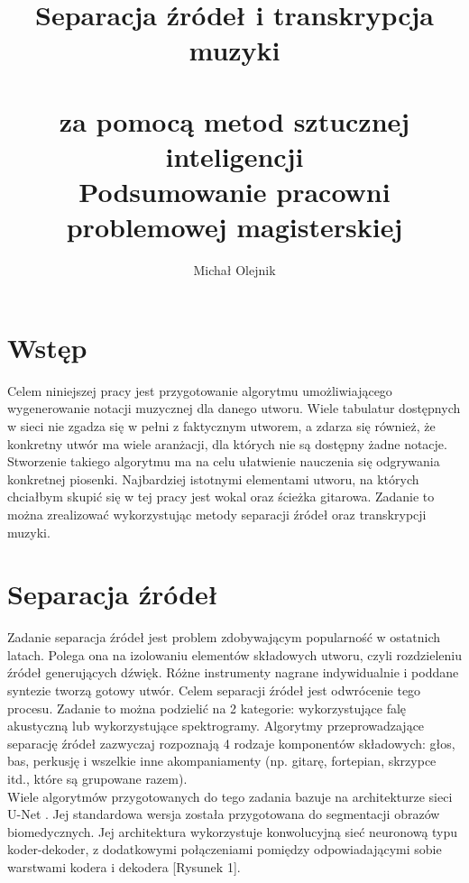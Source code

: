 \documentclass{article}
\begin{document}
\title{%
  Separacja źródeł i transkrypcja muzyki \\ \\
  za pomocą metod sztucznej inteligencji \\
  \vspace{1em} \large Podsumowanie pracowni problemowej magisterskiej}

\author{Michał Olejnik}
\date{}
\maketitle
{
    \hypersetup{linkcolor=black}
    \tableofcontents
}

\section{Wstęp}

Celem niniejszej pracy jest przygotowanie algorytmu umożliwiającego wygenerowanie notacji muzycznej dla danego utworu. Wiele tabulatur dostępnych w sieci nie zgadza się w pełni z faktycznym utworem, a zdarza się również, że konkretny utwór ma wiele aranżacji, dla których nie są dostępny żadne notacje. Stworzenie takiego algorytmu ma na celu ułatwienie nauczenia się odgrywania konkretnej piosenki. Najbardziej istotnymi elementami utworu, na których chciałbym skupić się w tej pracy jest wokal oraz ścieżka gitarowa. Zadanie to można zrealizować wykorzystując metody separacji źródeł oraz transkrypcji muzyki.


\section{Separacja źródeł}
Zadanie separacja źródeł jest problem zdobywającym popularność w ostatnich latach. Polega ona na izolowaniu elementów składowych utworu, czyli rozdzieleniu źródeł generujących dźwięk. Różne instrumenty nagrane indywidualnie i poddane syntezie tworzą gotowy utwór. Celem separacji źródeł jest odwrócenie tego procesu. Zadanie to można podzielić na 2 kategorie: wykorzystujące falę akustyczną lub  wykorzystujące spektrogramy. Algorytmy przeprowadzające separację źródeł zazwyczaj rozpoznają 4 rodzaje komponentów składowych: głos, bas, perkusję i wszelkie inne akompaniamenty (np. gitarę, fortepian, skrzypce itd., które są grupowane razem).  \\

Wiele algorytmów przygotowanych do tego zadania bazuje na architekturze sieci U-Net \cite{ronneberger2015unet}. Jej standardowa wersja została przygotowana do segmentacji obrazów biomedycznych. Jej architektura wykorzystuje konwolucyjną sieć neuronową typu koder-dekoder, z dodatkowymi połączeniami pomiędzy odpowiadającymi sobie warstwami kodera i dekodera [Rysunek 1].\\
\end{document}
